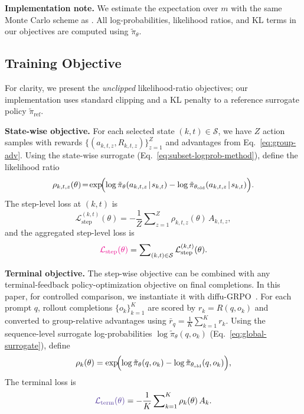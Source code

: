 \documentclass{article}
\theoremstyle{plain}
\theoremstyle{definition}
\theoremstyle{remark}
\begin{document}
\textbf{Implementation note.}
We estimate the expectation over $m$ with the same Monte Carlo scheme as \citet{zhao2025d1}.
All log-probabilities, likelihood ratios, and KL terms in our objectives are computed using $\tilde{\pi}_\theta$.

\subsection{Training Objective}
\label{sec:method-objective}
For clarity, we present the \emph{unclipped} likelihood-ratio objectives; our implementation uses standard clipping and a KL penalty to a reference surrogate policy $\tilde{\pi}_{\text{ref}}$.

\textbf{State-wise objective.}
For each selected state $(k,t)\in\mathcal{S}$, we have $Z$ action samples with rewards $\{(a_{k,t,z},R_{k,t,z})\}_{z=1}^Z$ and advantages from Eq.~\ref{eq:group-adv}.
Using the state-wise surrogate (Eq.~\ref{eq:subset-logprob-method}), define the likelihood ratio
\[
  \rho_{k,t,z}(\theta)
  \!=\!
  \exp\!\Bigl(
    \log \tilde{\pi}_\theta(a_{k,t,z}\!\mid\! s_{k,t})
    - \log \tilde{\pi}_{\theta_{\text{old}}}(a_{k,t,z}\!\mid\! s_{k,t})
  \Bigr).
\]
The step-level loss at $(k,t)$ is
\begin{equation}
  \mathcal{L}_{\text{step}}^{(k,t)}(\theta)
  =
  - \frac{1}{Z}\sum\nolimits_{z=1}^{Z} \rho_{k,t,z}(\theta)\, A_{k,t,z},
  \label{eq:inter-loss-method}
\end{equation}
and the aggregated step-level loss is
\begin{equation}
    \textcolor{Magenta}{\mathcal{L}_{\text{step}}(\theta)}=\sum\nolimits_{(k,t)\in\mathcal{S}} \mathcal{L}_{\text{step}}^{(k,t)}(\theta).
\end{equation}

\textbf{Terminal objective.}
The step-wise objective can be combined with any terminal-feedback policy-optimization objective on final completions.
In this paper, for controlled comparison, we instantiate it with diffu-GRPO~\citep{zhao2025d1}.
For each prompt $q$, rollout completions $\{o_k\}_{k=1}^K$ are scored by $r_k=R(q,o_k)$ and converted to group-relative advantages using $\bar r_q=\frac{1}{K}\sum_{k=1}^K r_k$.
Using the sequence-level surrogate log-probabilities $\log \tilde{\pi}_\theta(q,o_k)$ (Eq.~\ref{eq:global-surrogate}), define
\[
\rho_k(\theta)
=
\exp\!\Bigl(\log\tilde{\pi}_\theta(q,o_k)-\log\tilde{\pi}_{\theta_{\text{old}}}(q,o_k)\Bigr),
\]
The terminal loss is 
\begin{equation}
    \textcolor{Violet}{\mathcal{L}_{\text{term}}(\theta)} = -\frac{1}{K}\sum\nolimits_{k=1}^K \rho_k(\theta)\,A_k.
\end{equation}
\end{document}
